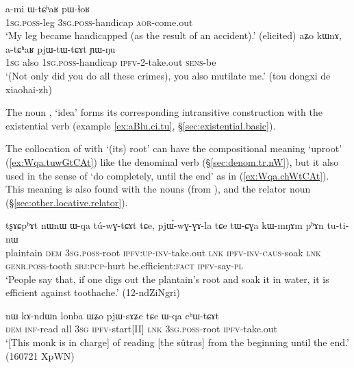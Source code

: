 \begin{exe}
\ex 
\begin{xlist}
\ex \label{ex:WtChaR.pWlhoR}
\gll a-mi ɯ-tɕʰaʁ pɯ-ɬoʁ \\
\textsc{1sg}.\textsc{poss}-leg \textsc{3sg}.\textsc{poss}-handicap \textsc{aor}-come.out \\
\glt `My leg became handicapped (as the result of an accident).' (elicited)
\ex \label{ex:atChaR.pjWtWtCAt}
\gll aʑo kɯnɤ, a-tɕʰaʁ pjɯ-tɯ-tɕɤt ɲɯ-ŋu \\
\textsc{1sg} also \textsc{1sg}.\textsc{poss}-handicap \textsc{ipfv}-2-take.out \textsc{sens}-be \\
\glt `(Not only did you do all these crimes), you also mutilate me.' (tou dongxi de xiaohai-zh)
\end{xlist}
\end{exe}

The noun , `idea' forms its corresponding intransitive construction with the existential verb  (example \ref{ex:aBlu.ci.tu}, §\ref{sec:existential.basic}).

The collocation of  with  `(its) root' can have the compositional meaning `uproot' (\ref{ex:Wqa.tuwGtCAt}) like the denominal verb (§\ref{sec:denom.tr.nW}), but it also used in the sense of `do completely, until the end' as in (\ref{ex:Wqa.chWtCAt}). This meaning is also found with the nouns  (from ),  and the relator noun  (§\ref{sec:other.locative.relator}).

\begin{exe}
\ex \label{ex:Wqa.tuwGtCAt}
\gll tʂɤɕpʰɤt nɯnɯ ɯ-qa tú-wɣ-tɕɤt tɕe, pjɯ́-wɣ-ɣɤ-la tɕe tɯ-ɕɣa kɯ-mŋɤm pʰɤn tu-ti-nɯ \\
plaintain \textsc{dem} \textsc{3sg}.\textsc{poss}-root \textsc{ipfv}:\textsc{up}-\textsc{inv}-take.out \textsc{lnk} \textsc{ipfv}-\textsc{inv}-\textsc{caus}-soak \textsc{lnk} \textsc{genr}.\textsc{poss}-tooth \textsc{sbj}:\textsc{pcp}-hurt be.efficient:\textsc{fact} \textsc{ipfv}-say-\textsc{pl} \\
\glt `People say that, if one digs out the plantain's root and soak it in water, it is efficient against toothache.' (12-ndZiNgri)
\end{exe}


\begin{exe}
\ex \label{ex:Wqa.chWtCAt}
\gll nɯ kɤ-ndɯn lonba ɯʑo pjɯ-sɤʑe tɕe ɯ-qa cʰɯ-tɕɤt \\
\textsc{dem} \textsc{inf}-read all \textsc{3sg} \textsc{ipfv}-start[II] \textsc{lnk} \textsc{3sg}.\textsc{poss}-root \textsc{ipfv}-take.out \\
\glt `[This monk is in charge] of reading [the sûtras] from the beginning until the end.' (160721 XpWN)
\end{exe} 


